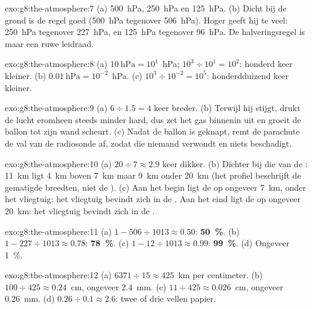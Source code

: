 \begin{solution}{exo:g8:the-atmosphere:7}
(a) \qty{500}{hPa}, \qty{250}{hPa} en \qty{125}{hPa}. (b) Dicht bij de
grond is de regel goed (\qty{500}{hPa} tegenover \qty{506}{hPa}). Hoger
geeft hij te veel: \qty{250}{hPa} tegenover \qty{227}{hPa}, en
\qty{125}{hPa} tegenover \qty{96}{hPa}. De halveringsregel is maar een
ruwe leidraad.
\end{solution}

\begin{solution}{exo:g8:the-atmosphere:8}
(a) $10~\text{hPa} = 10^1$~hPa; $10^3 \div 10^1 = 10^2$: honderd keer
kleiner. (b) $0.01~\text{hPa} = 10^{-2}$~hPa. (c) $10^3 \div 10^{-2} =
10^5$: honderdduizend keer kleiner.
\end{solution}

\begin{solution}{exo:g8:the-atmosphere:9}
(a) $6 \div 1.5 = 4$ keer breder. (b) Terwijl hij stijgt, drukt de lucht
eromheen steeds minder hard, dus zet het gas binnenin uit en groeit de
ballon tot zijn wand scheurt. (c) Nadat de ballon is geknapt, remt de
parachute de val van de radiosonde af, zodat die niemand verwondt en niets
beschadigt.
\end{solution}

\begin{solution}{exo:g8:the-atmosphere:10}
(a) $20 \div 7 \approx 2.9$ keer dikker. (b) Dichter bij die van de :
\qty{11}{km} ligt \qty{4}{km} boven \qty{7}{km} maar \qty{9}{km} onder
\qty{20}{km} (het profiel beschrijft de gematigde breedten, niet de
). (c) Aan het begin ligt de  op ongeveer \qty{7}{km},
onder het vliegtuig: het vliegtuig bevindt zich in de . Aan het
eind ligt de  op ongeveer \qty{20}{km}: het vliegtuig bevindt
zich in de .
\end{solution}

\begin{solution}{exo:g8:the-atmosphere:11}
(a) $1 - 506 \div 1013 \approx 0.50$: \textbf{50~\%}. (b) $1 - 227 \div
1013 \approx 0.78$: \textbf{78~\%}. (c) $1 - 12 \div 1013 \approx 0.99$:
\textbf{99~\%}. (d) Ongeveer 1~\%.
\end{solution}

\begin{solution}{exo:g8:the-atmosphere:12}
(a) $6371 \div 15 \approx 425$~km per centimeter. (b) $100 \div 425
\approx 0.24$~cm, ongeveer \qty{2.4}{mm}. (c) $11 \div 425 \approx
0.026$~cm, ongeveer \qty{0.26}{mm}. (d) $0.26 \div 0.1 \approx 2.6$: twee
of drie vellen papier.
\end{solution}

